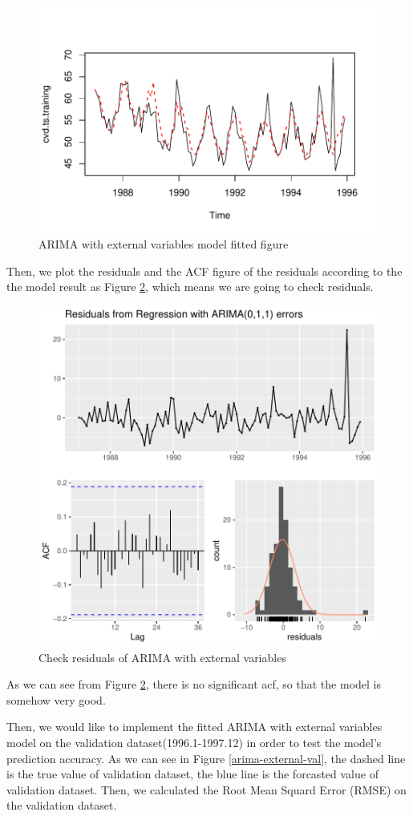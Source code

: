 \documentclass{article}
\begin{document}
\vspace{-15pt}
\begin{figure}[H]
    \centering
    \includegraphics[width=0.6\linewidth]{images/arima-external-fit}
    \caption{ARIMA with external variables model fitted figure}
    \label{arima-external-fit}
\end{figure}
Then, we plot the residuals and the ACF figure of the residuals according to the the model result as Figure \ref{arima-external-acf}, which means we are going to check residuals. 
\begin{figure}[H]
    \centering
    \includegraphics[width=0.58\linewidth]{images/arima-external-acf}
    \caption{Check residuals of ARIMA with external variables}
    \label{arima-external-acf}
\end{figure}
As we can see from Figure \ref{arima-external-acf}, there is no significant acf, so that the model is somehow very good. 

\vspace{4pt}
Then, we would like to implement the fitted ARIMA with external variables model on the validation dataset(1996.1-1997.12) in order to test the model's prediction accuracy. As we can see in Figure \ref{arima-external-val}, the dashed line is the true 
value of validation dataset, the blue line is the forcasted value of validation dataset. Then, we calculated the Root Mean Squard Error (RMSE) on the validation dataset. 
\end{document}
